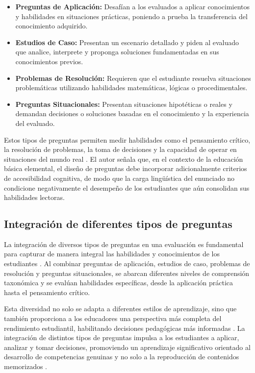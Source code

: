 \begin{itemize}[leftmargin=*]
  \item \textbf{Preguntas de Aplicación:} Desafían a los evaluados a aplicar conocimientos y habilidades en situaciones prácticas, poniendo a prueba la transferencia del conocimiento adquirido.
  \item \textbf{Estudios de Caso:} Presentan un escenario detallado y piden al evaluado que analice, interprete y proponga soluciones fundamentadas en sus conocimientos previos.
  \item \textbf{Problemas de Resolución:} Requieren que el estudiante resuelva situaciones problemáticas utilizando habilidades matemáticas, lógicas o procedimentales.
  \item \textbf{Preguntas Situacionales:} Presentan situaciones hipotéticas o reales y demandan decisiones o soluciones basadas en el conocimiento y la experiencia del evaluado.
\end{itemize}

Estos tipos de preguntas permiten medir habilidades como el pensamiento crítico, la resolución de problemas, la toma de decisiones y la capacidad de operar en situaciones del mundo real \cite{mayer2014multimedia}. El autor señala que, en el contexto de la educación básica elemental, el diseño de preguntas debe incorporar adicionalmente criterios de accesibilidad cognitiva, de modo que la carga lingüística del enunciado no condicione negativamente el desempeño de los estudiantes que aún consolidan sus habilidades lectoras.

\subsection{Integración de diferentes tipos de preguntas}

La integración de diversos tipos de preguntas en una evaluación es fundamental para capturar de manera integral las habilidades y conocimientos de los estudiantes \cite{evans2020cbe,maskos2025fa}. Al combinar preguntas de aplicación, estudios de caso, problemas de resolución y preguntas situacionales, se abarcan diferentes niveles de comprensión taxonómica y se evalúan habilidades específicas, desde la aplicación práctica hasta el pensamiento crítico.

Esta diversidad no solo se adapta a diferentes estilos de aprendizaje, sino que también proporciona a los educadores una perspectiva más completa del rendimiento estudiantil, habilitando decisiones pedagógicas más informadas \cite{maskos2025fa}. La integración de distintos tipos de preguntas impulsa a los estudiantes a aplicar, analizar y tomar decisiones, promoviendo un aprendizaje significativo orientado al desarrollo de competencias genuinas y no solo a la reproducción de contenidos memorizados \cite{hattie2007feedback}.


